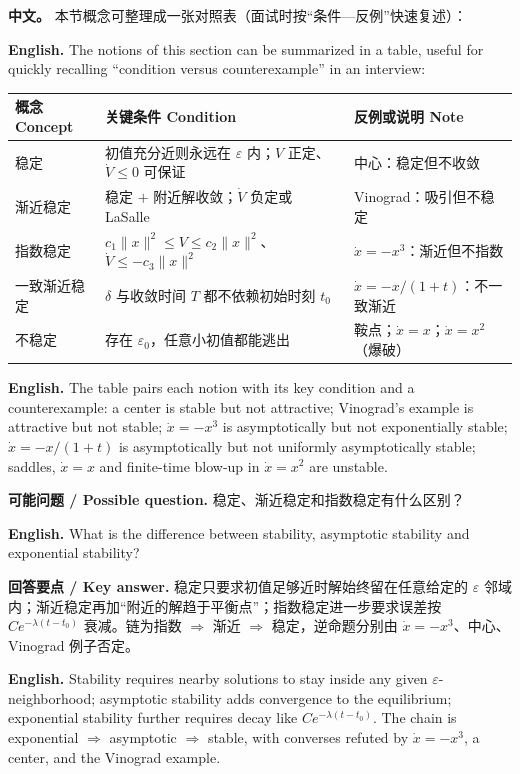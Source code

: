 \documentclass[UTF8,11pt,a4paper]{ctexart}
\newcommand{\EN}[1]{\par\noindent\textbf{English.} #1\par}
\newcommand{\ASK}[4]{\begin{samepage}\par\noindent\textbf{可能问题 / Possible question.} #1\par\EN{#2}\noindent\textbf{回答要点 / Key answer.} #3\par\EN{#4}\smallskip\end{samepage}}
\newcommand{\APS}[2]{\par\noindent\textbf{中文。} #1\par\noindent\textbf{English.} #2\par}
\newcommand{\norm}[1]{\lVert #1\rVert}\newcommand{\abs}[1]{\lvert #1\rvert}
\begin{document}
\APS{本节概念可整理成一张对照表（面试时按“条件—反例”快速复述）：}{The notions of this section can be summarized in a table, useful for quickly recalling “condition versus counterexample” in an interview:}
\begin{center}\small
\setlength{\tabcolsep}{4pt}\renewcommand{\arraystretch}{1.06}
\begin{tabular}{p{2.5cm}p{8.4cm}p{4.8cm}}
\hline
\textbf{概念 Concept} & \textbf{关键条件 Condition} & \textbf{反例或说明 Note}\\
\hline
稳定 & 初值充分近则永远在 $\varepsilon$ 内；$V$ 正定、$\dot V\le0$ 可保证 & 中心：稳定但不收敛\\
渐近稳定 & 稳定 $+$ 附近解收敛；$\dot V$ 负定或 LaSalle & Vinograd：吸引但不稳定\\
指数稳定 & $c_1\norm{x}^2\le V\le c_2\norm{x}^2$、$\dot V\le-c_3\norm{x}^2$ & $\dot x=-x^3$：渐近但不指数\\
一致渐近稳定 & $\delta$ 与收敛时间 $T$ 都不依赖初始时刻 $t_0$ & $\dot x=-x/(1+t)$：不一致渐近\\
不稳定 & 存在 $\varepsilon_0$，任意小初值都能逃出 & 鞍点；$\dot x=x$；$\dot x=x^2$（爆破）\\
\hline
\end{tabular}
\end{center}
\EN{The table pairs each notion with its key condition and a counterexample: a center is stable but not attractive; Vinograd's example is attractive but not stable; $\dot x=-x^3$ is asymptotically but not exponentially stable; $\dot x=-x/(1+t)$ is asymptotically but not uniformly asymptotically stable; saddles, $\dot x=x$ and finite-time blow-up in $\dot x=x^2$ are unstable.}


\ASK{稳定、渐近稳定和指数稳定有什么区别？}{What is the difference between stability, asymptotic stability and exponential stability?}{稳定只要求初值足够近时解始终留在任意给定的 $\varepsilon$ 邻域内；渐近稳定再加“附近的解趋于平衡点”；指数稳定进一步要求误差按 $Ce^{-\lambda(t-t_0)}$ 衰减。链为指数 $\Rightarrow$ 渐近 $\Rightarrow$ 稳定，逆命题分别由 $\dot x=-x^3$、中心、Vinograd 例子否定。}{Stability requires nearby solutions to stay inside any given $\varepsilon$-neighborhood; asymptotic stability adds convergence to the equilibrium; exponential stability further requires decay like $Ce^{-\lambda(t-t_0)}$. The chain is exponential $\Rightarrow$ asymptotic $\Rightarrow$ stable, with converses refuted by $\dot x=-x^3$, a center, and the Vinograd example.}
\end{document}
